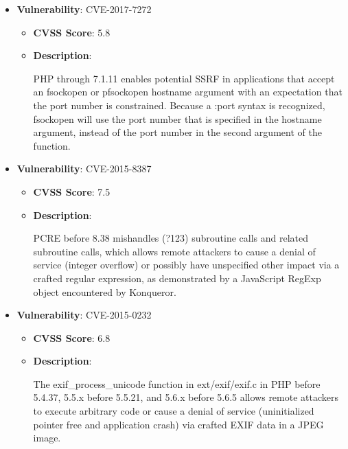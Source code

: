 \documentclass{article}
\begin{document}
\begin{itemize}
        \item \textbf{Vulnerability}: CVE-2017-7272
        \begin{itemize}
            \item \textbf{CVSS Score}:  5.8 
            \item \textbf{Description}:
            \parbox[t]{0.9\linewidth}{
                \ttfamily PHP through 7.1.11 enables potential SSRF in applications that accept an fsockopen or pfsockopen hostname argument with an expectation that the port number is constrained. Because a :port syntax is recognized, fsockopen will use the port number that is specified in the hostname argument, instead of the port number in the second argument of the function.
            }
        \end{itemize}
    
        \item \textbf{Vulnerability}: CVE-2015-8387
        \begin{itemize}
            \item \textbf{CVSS Score}:  7.5 
            \item \textbf{Description}:
            \parbox[t]{0.9\linewidth}{
                \ttfamily PCRE before 8.38 mishandles (?123) subroutine calls and related subroutine calls, which allows remote attackers to cause a denial of service (integer overflow) or possibly have unspecified other impact via a crafted regular expression, as demonstrated by a JavaScript RegExp object encountered by Konqueror.
            }
        \end{itemize}
    
        \item \textbf{Vulnerability}: CVE-2015-0232
        \begin{itemize}
            \item \textbf{CVSS Score}:  6.8 
            \item \textbf{Description}:
            \parbox[t]{0.9\linewidth}{
                \ttfamily The exif\_process\_unicode function in ext/exif/exif.c in PHP before 5.4.37, 5.5.x before 5.5.21, and 5.6.x before 5.6.5 allows remote attackers to execute arbitrary code or cause a denial of service (uninitialized pointer free and application crash) via crafted EXIF data in a JPEG image.
            }
        \end{itemize}
    

\end{itemize}
\end{document}
